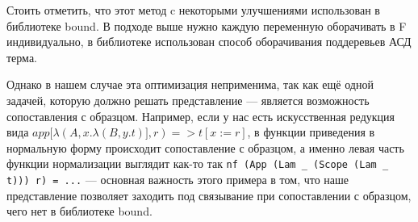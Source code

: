 Стоить отметить, что этот метод c некоторыми улучшениями использован в библиотеке bound\cite{bound}. В подходе выше нужно каждую переменную оборачивать в F индивидуально, в библиотеке использован способ оборачивания поддеревьев АСД терма.

Однако в нашем случае эта оптимизация неприменима, так как ещё одной задачей, которую должно решать представление --- является возможность сопоставления с образцом. Например, если у нас есть искусственная редукция вида $app[\lambda(A, x.\lambda(B, y.t)], r) => t[x:=r]$, в функции приведения в нормальную форму происходит сопоставление с образцом, а именно левая часть функции нормализации выглядит как-то так \lstinline{nf (App (Lam _ (Scope (Lam _ t))) r) = ...} --- основная важность этого примера в том, что наше представление позволяет заходить под связывание при сопоставлении с образцом, чего нет в библиотеке bound.
